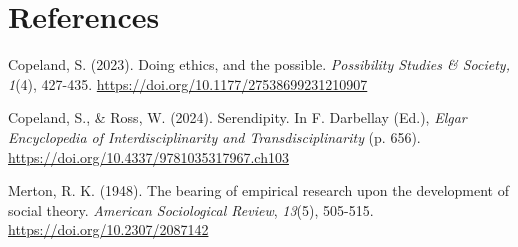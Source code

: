 \documentclass[authordate, empirical]{jote-new-article}
\begin{document}
	\section{References}




	Copeland, S. (2023). Doing ethics, and the possible. \emph{Possibility Studies \& Society,} \emph{1}(4), 427-435. \url{https://doi.org/10.1177/27538699231210907}


	Copeland, S., \& Ross, W. (2024). Serendipity. In F. Darbellay (Ed.), \emph{Elgar Encyclopedia of Interdisciplinarity and Transdisciplinarity }(p. 656). \url{https://doi.org/10.4337/9781035317967.ch103}



	Merton, R. K. (1948). The bearing of empirical research upon the development of social theory. \emph{American Sociological Review}, \emph{13}(5), 505-515. \url{https://doi.org/10.2307/2087142}
\end{document}
